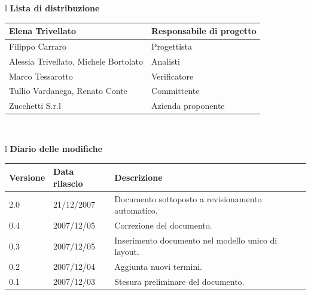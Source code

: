 \documentclass[11pt,titlepage,a4paper]{report}
\begin{document}
\begin{center}
\begin{table}[hbtp]
\large{
\begin{tabular}{l}
\Large{\textbf{\textsf{Lista di distribuzione}}} \\
\begin{tabular}{||p{6cm}||p{6cm}||} \hline
{Elena Trivellato}& Responsabile di progetto \\ \hline 
{Filippo Carraro}& Progettista \\ \hline
{Alessia Trivellato, Michele Bortolato}& Analisti \\ \hline
{Marco Tessarotto}& Verificatore \\ \hline
{Tullio Vardanega, Renato Conte}& Committente \\ \hline 
{Zucchetti S.r.l}& Azienda proponente\\ \hline
\end{tabular} \\
\end{tabular}
}
\end{table}
\begin{table}[hbtp]
\large{
\begin{tabular}{l}
\Large{\textbf{\textsf{Diario delle modifiche}}} \\
\begin{tabular}{||p{2cm}||p{3.5cm}||p{6cm}||} \hline
\textbf{Versione} & \textbf{Data rilascio} & \textbf{Descrizione} \\ \hline
2.0 & 21/12/2007 & Documento sottoposto a revisionamento automatico.\\ \hline
0.4 & 2007/12/05 & Correzione del documento. \\ \hline
0.3 & 2007/12/05 & Inserimento documento nel modello unico di layout. \\ \hline
0.2 & 2007/12/04 & Aggiunta nuovi termini. \\ \hline
0.1 & 2007/12/03 & Stesura preliminare del documento. \\ \hline

\end{tabular} \\
\end{tabular}

}
\end{table}
\end{center}
\newpage
\end{document}
